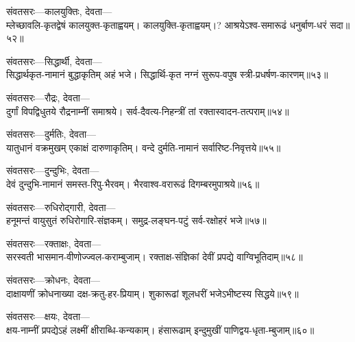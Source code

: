 संवतसरः---कालयुक्तिः, देवता---\\

म्लेच्छावलि-कृतद्वेषं कालयुक्त-कृताह्वयम्। कालयुक्ति-कृताह्वयम्।?
आश्रयेऽश्व-समारूढं धनुर्बाण-धरं सदा॥५२॥

संवतसरः---सिद्धार्थी, देवता---\\

सिद्धार्थकृत-नामानं बुद्धाकृतिम् अहं भजे। सिद्धार्थि-कृत
नग्नं सुरूप-वपुष स्त्री-प्रधर्षण-कारणम्॥५३॥

संवतसरः---रौद्रः, देवता---\\

दुर्गां विपद्विधुतये रौद्रनाम्नीं समाश्रये।
सर्व-दैवत्य-निहन्त्रीं तां रक्तास्वादन-तत्पराम्॥५४॥

संवतसरः---दुर्मतिः, देवता---\\

यातुधानं वक्रमुखम् एकाक्षं दारुणाकृतिम्।
वन्दे दुर्मति-नामानं सर्वारिष्ट-निवृत्तये॥५५॥

संवतसरः---दुन्दुभिः, देवता---\\

देवं दुन्दुभि-नामानं समस्त-रिपु-भैरवम्।
भैरवाश्व-वरारूढं दिगम्बरमुपाश्रये॥५६॥

संवतसरः---रुधिरोद्गारी, देवता---\\

हनूमन्तं वायुसुतं रुधिरोगारि-संज्ञकम्।
समुद्र-लङ्घन-पटुं सर्व-रक्षोहरं भजे॥५७॥

संवतसरः---रक्ताक्षः, देवता---\\

सरस्वती भासमान-वीणोज्ज्वल-कराम्बुजाम्।
रक्ताक्ष-संज्ञिकां देवीं प्रपद्ये वाग्विभूतिदाम्॥५८॥

संवतसरः---क्रोधनः, देवता---\\

दाक्षायणीं क्रोधनाख्या दक्ष-क्रतु-हर-प्रियाम्।
शुकारूढां शूलधरीं भजेऽभीष्टस्य सिद्धये॥५९॥

संवतसरः---क्षयः, देवता---\\

क्षय-नाम्नीं प्रपद्येऽहं लक्ष्मीं क्षीराब्धि-कन्यकाम्।
हंसारूढाम् इन्दुमुखीं पाणिद्वय-धृता-म्बुजाम्॥६०॥
